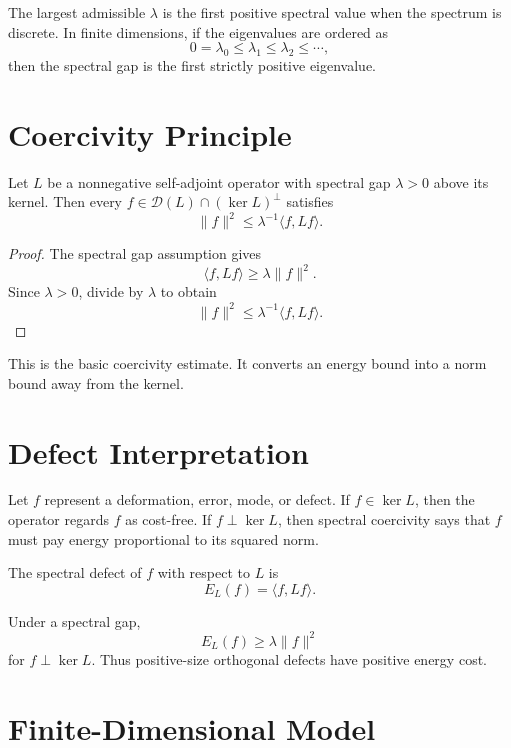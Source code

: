 The largest admissible \(\lambda\) is the first positive spectral value when
the spectrum is discrete. In finite dimensions, if the eigenvalues are ordered
as
\[
0=\lambda_0\le \lambda_1\le \lambda_2\le\cdots,
\]
then the spectral gap is the first strictly positive eigenvalue.

\section{Coercivity Principle}

\begin{theorem}
Let \(L\) be a nonnegative self-adjoint operator with spectral gap
\(\lambda>0\) above its kernel. Then every
\(f\in\mathcal D(L)\cap{(\ker L)}^\perp\) satisfies
\[
\|f\|^2\le \lambda^{-1}\langle f,Lf\rangle.
\]
\end{theorem}

\begin{proof}
The spectral gap assumption gives
\[
\langle f,Lf\rangle\ge \lambda\|f\|^2.
\]
Since \(\lambda>0\), divide by \(\lambda\) to obtain
\[
\|f\|^2\le \lambda^{-1}\langle f,Lf\rangle.
\]
\end{proof}

This is the basic coercivity estimate. It converts an energy bound into a
norm bound away from the kernel.

\section{Defect Interpretation}

Let \(f\) represent a deformation, error, mode, or defect. If \(f\in\ker L\),
then the operator regards \(f\) as cost-free. If
\(f\perp\ker L\), then spectral coercivity says that \(f\) must pay energy
proportional to its squared norm.

\begin{definition}
The spectral defect of \(f\) with respect to \(L\) is
\[
E_L(f)=\langle f,Lf\rangle.
\]
\end{definition}

Under a spectral gap,
\[
E_L(f)\ge \lambda\|f\|^2
\]
for \(f\perp\ker L\). Thus positive-size orthogonal defects have positive
energy cost.

\section{Finite-Dimensional Model}

